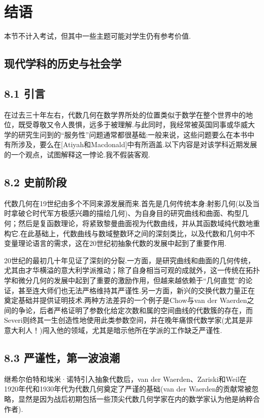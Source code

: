 \chapter{结语}


本节不计入考试，但其中一些主题可能对学生仍有参考价值.

\section{现代学科的历史与社会学}

\section{8.1 引言}

在过去三十年左右，代数几何在数学界所处的位置类似于数学在整个世界中的地位，既受尊敬又令人畏惧，远多于被理解.与此同时，我经常被英国同事或华威大学的研究生问到的“服务性”问题通常都很基础:一般来说，这些问题要么在本书中有所涉及，要么在[Atiyah和Macdonald]中有所涵盖.以下内容是对该学科近期发展的一个观点，试图解释这一悖论.我不假装客观.

\section{8.2 史前阶段}

代数几何在19世纪由多个不同来源发展而来.首先是几何传统本身:射影几何(以及当时拿破仑时代军方极感兴趣的描绘几何)、为自身目的研究曲线和曲面、构型几何；然后是复函数理论，将紧致黎曼曲面视为代数曲线，并从其函数域纯代数地重构它.在此基础上，代数曲线与数域整数环之间的深刻类比，以及代数和几何中不变量理论语言的需求，这在20世纪初抽象代数的发展中起到了重要作用.

20世纪的最初几十年见证了深刻的分裂.一方面，是研究曲线和曲面的几何传统，尤其由才华横溢的意大利学派推动；除了自身相当可观的成就外，这一传统在拓扑学和微分几何的发展中起到了重要的激励作用，但越来越依赖于“几何直觉”的论证，甚至连大师们也无法严格维持其严谨性.另一方面，新兴的交换代数力量正在奠定基础并提供证明技术.两种方法差异的一个例子是Chow与van der Waerden之间的争论，后者严格证明了参数化给定次数和属的空间曲线的代数簇的存在，而Severi则终其一生创造性地使用此类参数空间，并在晚年痛恨代数学家(尤其是非意大利人！)闯入他的领域，尤其是暗示他所在学派的工作缺乏严谨性.

\section{8.3 严谨性，第一波浪潮}

继希尔伯特和埃米·诺特引入抽象代数后，van der Waerden、Zariski和Weil在1920年代和1930年代为代数几何奠定了严谨的基础(van der Waerden的贡献常被忽略，显然是因为战后初期包括一些顶尖代数几何学家在内的数学家认为他是纳粹合作者).


